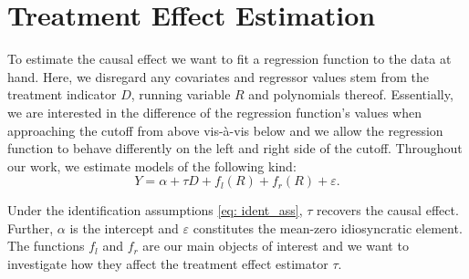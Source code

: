 
\section{Treatment Effect Estimation} %
\label{sec: estim}

To estimate the causal effect we want to fit a regression function to the data at hand. Here, we disregard any covariates and regressor values stem from the treatment indicator $D$, running variable $R$ and polynomials thereof. Essentially, we are interested in the difference of the regression function's values when approaching the cutoff from above vis-à-vis below and we allow the regression function to behave differently on the left and right side of the cutoff. Throughout our work, we estimate models of the following kind:
\begin{equation}
Y = \alpha + \tau D + f_{l}(R) + f_{r}(R) + \varepsilon .
\label{eq: model_general}
\end{equation}

Under the identification assumptions \ref{eq: ident_ass}, $\tau$ recovers the causal effect. Further, $\alpha$ is the intercept and $\varepsilon$ constitutes the mean-zero idiosyncratic element. The functions $f_{l}$ and $f_{r}$ are our main objects of interest and we want to investigate how they affect the treatment effect estimator $\tau$.


